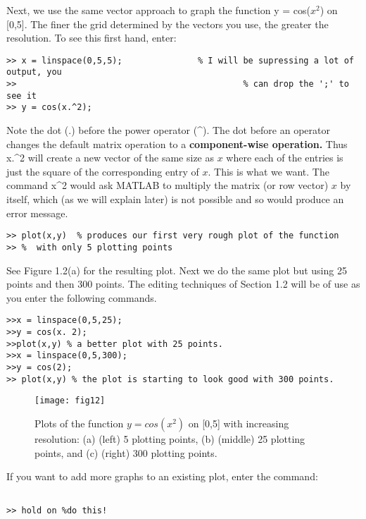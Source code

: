 \documentclass[../main.tex]{subfiles}
\begin{document}
Next, we use the same vector approach to graph the function y = cos($x^2$)
on [0,5]. The finer the grid determined by the vectors you use, the greater the
resolution. To see this first hand, enter: 

\begin{verbatim}
>> x = linspace(0,5,5);               % I will be supressing a lot of output, you
>> 			                                   % can drop the ';' to see it
>> y = cos(x.^2); 
\end{verbatim}

Note the dot (.) before the power operator (\^{}). The dot before an operator
changes the default matrix operation to a \textbf{component-wise operation.} Thus x.\^{}2 
will create a new vector of the same size as $x$ where each of the entries is just the
square of the corresponding entry of $x$. This is what we want. The command x\^{}2
would ask MATLAB to multiply the matrix (or row vector) $x$ by itself, which (as
we will explain later) is not possible and so would produce an error message. 

\begin{verbatim}
>> plot(x,y)  % produces our first very rough plot of the function
>> %  with only 5 plotting points
\end{verbatim}

See Figure 1.2(a) for the resulting plot. Next we do the same plot but using 25
points and then 300 points. The editing techniques of Section 1.2 will be of use
as you enter the following commands. 

\begin{verbatim}
>>x = linspace(0,5,25);
>>y = cos(x. 2);
>>plot(x,y) % a better plot with 25 points.
>>x = linspace(0,5,300);
>>y = cos(2);
>> plot(x,y) % the plot is starting to look good with 300 points. 
\end{verbatim}


\begin{figure}[H]
\centering
\texttt{[image: fig12]}
\caption{Plots of the function $y = cos(x^2)$ on [0,5] with increasing resolution: (a)
(left) 5 plotting points, (b) (middle) 25 plotting points, and (c) (right) 300 plotting points. }
\label{fig:fig_1_2}
\end{figure}

If you want to add more graphs to an existing plot, enter the command:

\begin{verbatim}

>> hold on %do this!

\end{verbatim}
\end{document}
